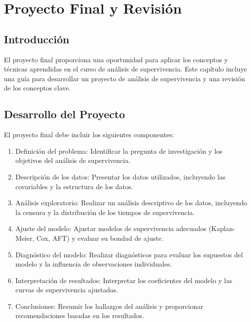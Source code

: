 \documentclass[a4paper]{report} %
\begin{document}
\chapter{Proyecto Final y Revisión}

\section{Introducci\'on}
El proyecto final proporciona una oportunidad para aplicar los conceptos y t\'ecnicas aprendidas en el curso de análisis de supervivencia. Este cap\'itulo incluye una gu\'ia para desarrollar un proyecto de análisis de supervivencia y una revisi\'on de los conceptos clave.

\section{Desarrollo del Proyecto}
El proyecto final debe incluir los siguientes componentes:
\begin{enumerate}
    \item Definici\'on del problema: Identificar la pregunta de investigaci\'on y los objetivos del análisis de supervivencia.
    \item Descripci\'on de los datos: Presentar los datos utilizados, incluyendo las covariables y la estructura de los datos.
    \item Análisis exploratorio: Realizar un análisis descriptivo de los datos, incluyendo la censura y la distribuci\'on de los tiempos de supervivencia.
    \item Ajuste del modelo: Ajustar modelos de supervivencia adecuados (Kaplan-Meier, Cox, AFT) y evaluar su bondad de ajuste.
    \item Diagn\'ostico del modelo: Realizar diagn\'osticos para evaluar los supuestos del modelo y la influencia de observaciones individuales.
    \item Interpretaci\'on de resultados: Interpretar los coeficientes del modelo y las curvas de supervivencia ajustadas.
    \item Conclusiones: Resumir los hallazgos del análisis y proporcionar recomendaciones basadas en los resultados.
\end{enumerate}
\end{document}
